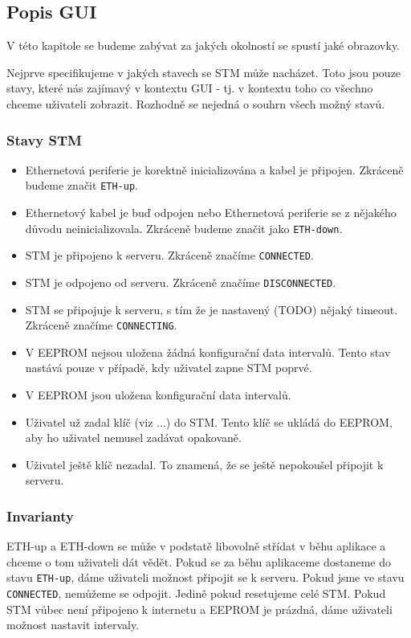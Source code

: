 
\subsection{Popis GUI} \label{popis-gui}
V této kapitole se budeme zabývat za jakých okolností se spustí jaké obrazovky.

Nejprve specifikujeme v jakých stavech se STM může nacházet.
Toto jsou pouze stavy, které nás zajímavý v kontextu GUI - tj. v kontextu toho co všechno chceme
uživateli zobrazit.
Rozhodně se nejedná o souhrn všech možný stavů.
\subsubsection{Stavy STM}
\begin{itemize}
  \item Ethernetová periferie je korektně inicializována a kabel je připojen. Zkráceně budeme
        značit \texttt{ETH-up}.
  \item Ethernetový kabel je buď odpojen nebo Ethernetová periferie se z nějakého důvodu
        neinicializovala. Zkráceně budeme značit jako \texttt{ETH-down}.
  \item STM je připojeno k serveru. Zkráceně značíme \texttt{CONNECTED}.
  \item STM je odpojeno od serveru. Zkráceně značíme \texttt{DISCONNECTED}.
  \item STM se připojuje k serveru, s tím že je nastavený (TODO) nějaký timeout. Zkráceně značíme
        \texttt{CONNECTING}.
  \item V EEPROM nejsou uložena žádná konfigurační data intervalů. Tento stav nastává pouze v případě,
        kdy uživatel zapne STM poprvé.
  \item V EEPROM jsou uložena konfigurační data intervalů.
  \item Uživatel už zadal klíč (viz ...) do STM. Tento klíč se ukládá do EEPROM, aby ho uživatel
        nemusel zadávat opakovaně.
  \item Uživatel ještě klíč nezadal. To znamená, že se ještě nepokoušel připojit k serveru.
\end{itemize}

\subsubsection{Invarianty}
ETH-up a ETH-down se může v podstatě libovolně střídat v běhu aplikace a chceme o tom uživateli
dát vědět.
Pokud se za běhu aplikaceme dostaneme do stavu \texttt{ETH-up}, dáme uživateli možnost připojit
se k serveru.
Pokud jsme ve stavu \texttt{CONNECTED}, nemůžeme se odpojit. Jedině pokud resetujeme celé STM.
Pokud STM vůbec není připojeno k internetu a EEPROM je prázdná, dáme uživateli možnost nastavit
intervaly.

